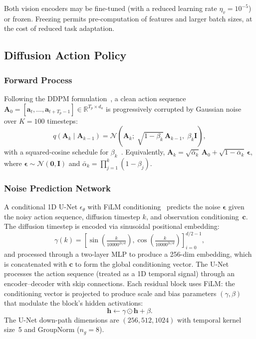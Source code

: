 \documentclass[conference]{IEEEtran}
\begin{document}
Both vision encoders may be fine-tuned (with a reduced learning rate $\eta_v = 10^{-5}$) or frozen. Freezing permits pre-computation of features and larger batch sizes, at the cost of reduced task adaptation.

\subsection{Diffusion Action Policy}
\label{sec:diffusion}

\subsubsection{Forward Process}
Following the DDPM formulation~\cite{ho2020ddpm}, a clean action sequence $\mathbf{A}_0 = [\mathbf{a}_t, \ldots, \mathbf{a}_{t+T_p-1}] \in \mathbb{R}^{T_p \times d_a}$ is progressively corrupted by Gaussian noise over $K = 100$ timesteps:
\begin{equation}
\label{eq:forward}
q(\mathbf{A}_k \mid \mathbf{A}_{k-1}) = \mathcal{N}\!\left(\mathbf{A}_k;\;\sqrt{1-\beta_k}\,\mathbf{A}_{k-1},\;\beta_k\mathbf{I}\right),
\end{equation}
with a squared-cosine schedule for $\beta_k$~\cite{chi2023diffusion}. Equivalently, $\mathbf{A}_k = \sqrt{\bar\alpha_k}\,\mathbf{A}_0 + \sqrt{1-\bar\alpha_k}\,\boldsymbol\epsilon$, where $\boldsymbol\epsilon \sim \mathcal{N}(\mathbf{0},\mathbf{I})$ and $\bar\alpha_k = \prod_{j=1}^k (1-\beta_j)$.

\subsubsection{Noise Prediction Network}
A conditional 1D U-Net $\epsilon_\theta$ with FiLM conditioning~\cite{chi2023diffusion} predicts the noise $\boldsymbol\epsilon$ given the noisy action sequence, diffusion timestep $k$, and observation conditioning~$\mathbf{c}$. The diffusion timestep is encoded via sinusoidal positional embedding:
\begin{equation}
\label{eq:temb}
\gamma(k) = \left[\sin\!\left(\tfrac{k}{10000^{2i/d}}\right), \cos\!\left(\tfrac{k}{10000^{2i/d}}\right)\right]_{i=0}^{d/2-1},
\end{equation}
and processed through a two-layer MLP to produce a 256-dim embedding, which is concatenated with $\mathbf{c}$ to form the global conditioning vector. The U-Net processes the action sequence (treated as a 1D temporal signal) through an encoder--decoder with skip connections. Each residual block uses FiLM: the conditioning vector is projected to produce scale and bias parameters $(\gamma, \beta)$ that modulate the block's hidden activations:
\begin{equation}
\label{eq:film}
\mathbf{h} \leftarrow \gamma \odot \mathbf{h} + \beta.
\end{equation}
The U-Net down-path dimensions are $(256, 512, 1024)$ with temporal kernel size~5 and GroupNorm ($n_g = 8$).
\end{document}

